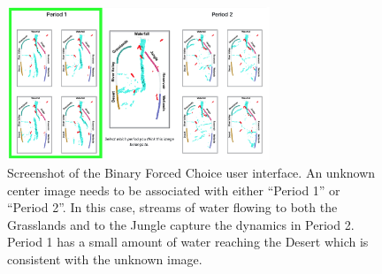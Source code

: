 \documentclass[letterpaper]{article} %
\newcommand{\kibitz}[2]{\ifnum\Comments=1{\textcolor{#1}{#2}}\fi}
\newcommand{\kg}[1]{\kibitz{red}{[KG:#1]}}
\begin{document}



\begin{figure}[t]
\centering
\includegraphics[width=0.70\textwidth]{images/test2_screenshot}
\caption{Screenshot of the  Binary Forced Choice  user interface. An unknown center image needs to be associated with either ``Period 1'' or ``Period 2''. In this case, streams of water flowing to both the Grasslands and to the Jungle capture the dynamics in Period 2. Period 1 has a small amount of water reaching the Desert which is consistent with the unknown image.}
\label{fig:test2_screenshot}
\end{figure}
\end{document}
